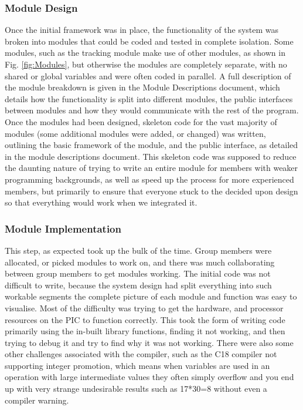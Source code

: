 \documentclass[]{report}
\begin{document}
\subsubsection{Module Design}
Once the initial framework was in place, the functionality of the system was broken into modules that could be coded and tested in complete isolation. Some modules, such as the tracking module make use of other modules, as shown in Fig. \ref{fig:Modules}, but otherwise the modules are completely separate, with no shared or global variables and were often coded in parallel. \newline
A full description of the module breakdown is given in the Module Descriptions document, which details how the functionality is split into different modules, the public interfaces between modules and how they would communicate with the rest of the program. \newline
Once the modules had been designed, skeleton code for the vast majority of modules (some additional modules were added, or changed) was written, outlining the basic framework of the module, and the public interface, as detailed in the module descriptions document. This skeleton code was supposed to reduce the daunting nature of trying to write an entire module for members with weaker programming backgrounds, as well as speed up the process for more experienced members, but primarily to ensure that everyone stuck to the decided upon design so that everything would work when we integrated it.

\subsubsection{Module Implementation}
This step, as expected took up the bulk of the time. Group members were allocated, or picked modules to work on, and there was much collaborating between group members to get modules working. The initial code was not difficult to write, because the system design had split everything into such workable segments the complete picture of each module and function was easy to visualise. Most of the difficulty was trying to get the hardware, and processor resources on the PIC to function correctly. This took the form of writing code primarily using the in-built library functions, finding it not working, and then trying to debug it and try to find why it was not working. There were also some other challenges associated with the compiler, such as the C18 compiler not supporting integer promotion, which means when variables are used in an operation with large intermediate values they often simply overflow and you end up with very strange undesirable results such as 17*30=8 without even a compiler warning.
\end{document}
